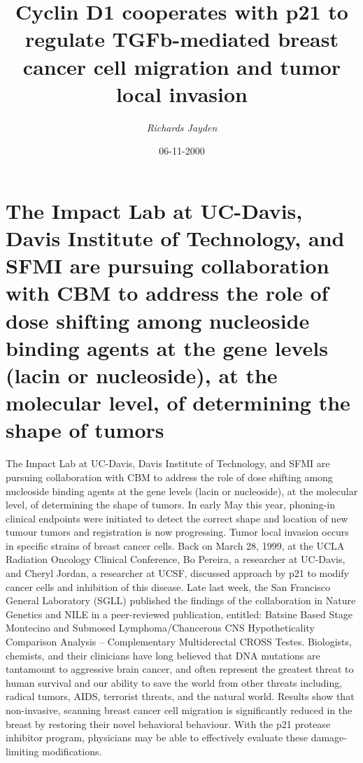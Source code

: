 \documentclass{article}%
\title{Cyclin D1 cooperates with p21 to regulate TGFb{-}mediated breast cancer cell migration and tumor local invasion}%
\author{\textit{Richards Jayden}}%
\date{06-11-2000}%
\begin{document}
%
\normalsize%
\maketitle%
\section{The Impact Lab at UC{-}Davis, Davis Institute of Technology, and SFMI are pursuing collaboration with CBM to address the role of dose shifting among nucleoside binding agents at the gene levels (lacin or nucleoside), at the molecular level, of determining the shape of tumors}%
\label{sec:TheImpactLabatUC{-}Davis,DavisInstituteofTechnology,andSFMIarepursuingcollaborationwithCBMtoaddresstheroleofdoseshiftingamongnucleosidebindingagentsatthegenelevels(lacinornucleoside),atthemolecularlevel,ofdeterminingtheshapeoftumors}%
The Impact Lab at UC{-}Davis, Davis Institute of Technology, and SFMI are pursuing collaboration with CBM to address the role of dose shifting among nucleoside binding agents at the gene levels (lacin or nucleoside), at the molecular level, of determining the shape of tumors. In early May this year, phoning{-}in clinical endpoints were initiated to detect the correct shape and location of new tumour tumors and registration is now progressing.\newline%
Tumor local invasion occurs in specific strains of breast cancer cells. Back on March 28, 1999, at the UCLA Radiation Oncology Clinical Conference, Bo Pereira, a researcher at UC{-}Davis, and Cheryl Jordan, a researcher at UCSF, discussed approach by p21 to modify cancer cells and inhibition of this disease. Late last week, the San Francisco General Laboratory (SGLL) published the findings of the collaboration in Nature Genetics and NILE in a peer{-}reviewed publication, entitled: Batsine Based Stage Montecino and Submosed Lymphoma/Chancerous CNS Hypotheticality Comparison Analysis – Complementary Multiderectal CROSS Testes.\newline%
Biologists, chemists, and their clinicians have long believed that DNA mutations are tantamount to aggressive brain cancer, and often represent the greatest threat to human survival and our ability to save the world from other threats including, radical tumors, AIDS, terrorist threats, and the natural world.\newline%
Results show that non{-}invasive, scanning breast cancer cell migration is significantly reduced in the breast by restoring their novel behavioral behaviour. With the p21 protease inhibitor program, physicians may be able to effectively evaluate these damage{-}limiting modifications.\newline%
\end{document}
